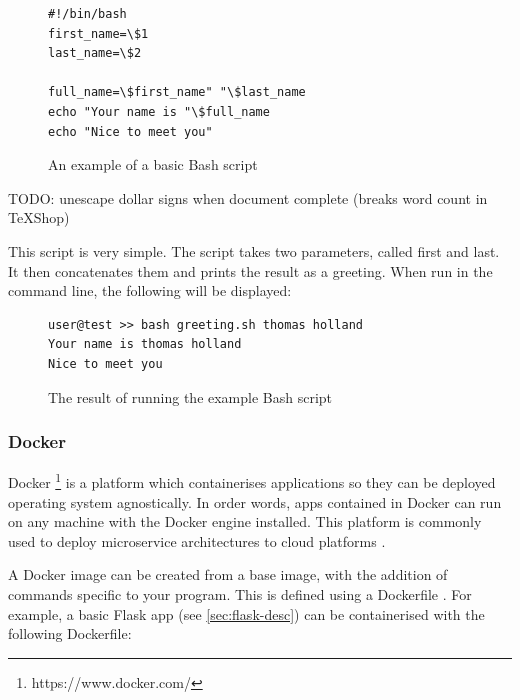 \documentclass[12pt, letterpaper]{article}
\begin{document}
\begin{flushleft}
\begin{figure}[H]
\begin{verbatim}
#!/bin/bash
first_name=\$1
last_name=\$2

full_name=\$first_name" "\$last_name
echo "Your name is "\$full_name
echo "Nice to meet you"
\end{verbatim}
\caption{An example of a basic Bash script}
\end{figure}
\end{flushleft}

TODO: unescape dollar signs when document complete (breaks word count in TeXShop)

\begin{flushleft}
This script is very simple. The script takes two parameters, called first and last. It then concatenates them and prints the result as a greeting. When run in the command line, the following will be displayed:
\end{flushleft}

\begin{flushleft}
\begin{figure}[H]
\begin{verbatim}
user@test >> bash greeting.sh thomas holland
Your name is thomas holland
Nice to meet you
\end{verbatim}
\caption{The result of running the example Bash script}
\end{figure}
\end{flushleft}

\subsubsection{Docker}\label{sec:docker-desc}

\begin{flushleft}
Docker
\footnote{https://www.docker.com/}
is a platform which containerises applications so they can be deployed operating system agnostically. In order words, apps contained in Docker can run on any machine with the Docker engine installed. This platform is commonly used to deploy microservice architectures to cloud platforms \cite{docker}.
\end{flushleft}

\begin{flushleft}
A Docker image can be created from a base image, with the addition of commands specific to your program. This is defined using a Dockerfile \cite{docker-example}. For example, a basic Flask app (see \ref{sec:flask-desc}) can be containerised with the following Dockerfile:
\end{flushleft}
\end{document}
